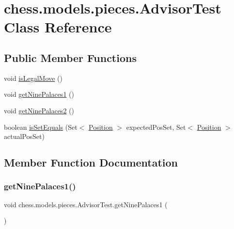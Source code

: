 \hypertarget{classchess_1_1models_1_1pieces_1_1_advisor_test}{}\section{chess.\+models.\+pieces.\+Advisor\+Test Class Reference}
\label{classchess_1_1models_1_1pieces_1_1_advisor_test}
\subsection*{Public Member Functions}
\begin{DoxyCompactItemize}
\item 
void \mbox{\hyperlink{classchess_1_1models_1_1pieces_1_1_advisor_test_a865ff283ac107e64d2d27044ff25d02e}{is\+Legal\+Move}} ()
\item 
void \mbox{\hyperlink{classchess_1_1models_1_1pieces_1_1_advisor_test_a2ad02e014939d5e49e8cead14fd2eed5}{get\+Nine\+Palaces1}} ()
\item 
void \mbox{\hyperlink{classchess_1_1models_1_1pieces_1_1_advisor_test_aaa1de333725dbd1fb065c71272d9d555}{get\+Nine\+Palaces2}} ()
\item 
boolean \mbox{\hyperlink{classchess_1_1models_1_1pieces_1_1_advisor_test_a620e5937f1e6bbe806b60f364e103d19}{is\+Set\+Equals}} (Set$<$ \mbox{\hyperlink{classchess_1_1models_1_1_position}{Position}} $>$ expected\+Pos\+Set, Set$<$ \mbox{\hyperlink{classchess_1_1models_1_1_position}{Position}} $>$ actual\+Pos\+Set)
\end{DoxyCompactItemize}


\subsection{Member Function Documentation}
\mbox{\label{classchess_1_1models_1_1pieces_1_1_advisor_test_a2ad02e014939d5e49e8cead14fd2eed5}} 
\subsubsection{\texorpdfstring{get\+Nine\+Palaces1()}{getNinePalaces1()}}
{\footnotesize\ttfamily void chess.\+models.\+pieces.\+Advisor\+Test.\+get\+Nine\+Palaces1 (\begin{DoxyParamCaption}{ }\end{DoxyParamCaption})}


